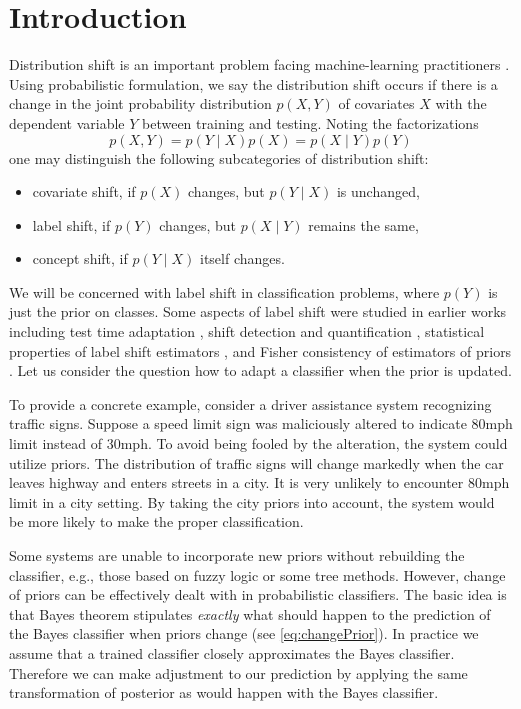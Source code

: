 \section{Introduction}



Distribution shift is an important problem facing machine-learning practitioners 
\cite{zhang2023dive, sugiyama2007covariate}.  Using probabilistic formulation, we say the distribution shift occurs if there is a change  in the joint probability distribution $p(X,Y)$ of covariates $X$ with the dependent variable $Y$  between training and testing. Noting the factorizations 
$$
p(X,Y) = p(Y\mid X)p(X) = p(X \mid Y )p(Y)
$$
one may distinguish the following subcategories of distribution shift:
\begin{itemize}
	\item covariate shift, if $p(X)$ changes, but $p(Y\mid X)$ is unchanged,
	\item label shift, if $p(Y)$ changes, but $p(X \mid Y)$ remains the same,
	\item concept shift, if $p(Y \mid X)$ itself changes.
\end{itemize}

We will be concerned with label shift in classification problems, where $p(Y)$ 
is just the prior on classes.  Some aspects of label shift were studied in
earlier works including test time adaptation
\cite{vsipka2022hitchhiker}, shift detection and quantification 
\cite{lipton2018detecting}, 
statistical properties of label shift estimators \cite{garg2020unified}, 
and Fisher consistency of estimators of priors \cite{tasche2017fisher}. 
Let us consider  the question 
how to adapt a classifier when the  prior is updated.

To provide a concrete example, consider a driver assistance system recognizing traffic signs. 
Suppose a speed limit sign was maliciously altered to indicate 80mph limit instead of 30mph.
To avoid being fooled by the alteration, the system could utilize priors.
The distribution of traffic signs will change markedly when the car leaves highway and enters streets in a city.
It is very unlikely to encounter 80mph limit in a city setting. By taking 
the city priors  into account, the system would be more likely to make the proper classification. 

Some systems are unable to incorporate new priors without rebuilding 
the classifier, e.g., those based 
on fuzzy logic or some tree methods. 
However, change of priors can be effectively dealt with in probabilistic 
classifiers. The basic idea is that Bayes theorem stipulates \emph{exactly} 
what should happen  to the prediction of the  Bayes classifier when priors 
change (see \eqref{eq:changePrior}).  In practice we assume that a trained 
classifier closely approximates the Bayes classifier. Therefore we can make 
adjustment to our prediction by applying the same transformation of posterior 
as would happen with the Bayes classifier. 

